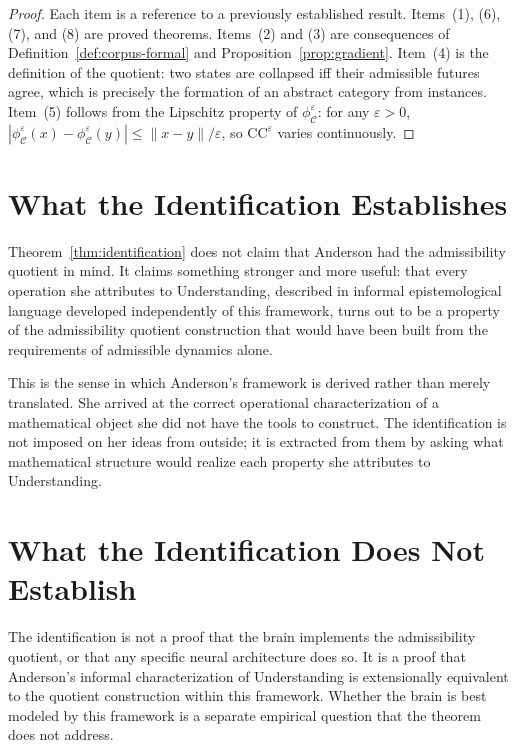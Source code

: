 \documentclass[12pt, a4paper, oneside]{book}
\newcommand{\C}{\mathcal{C}}
\newcommand{\CC}{\mathrm{CC}}
\newcommand{\phiCe}{\phi_{\C}^{\varepsilon}}
\begin{document}
\begin{proof}
Each item is a reference to a previously established result.
Items~(1), (6), (7), and (8) are proved theorems.
Items~(2) and (3) are consequences of Definition~\ref{def:corpus-formal}
and Proposition~\ref{prop:gradient}.
Item~(4) is the definition of the quotient: two states are collapsed iff
their admissible futures agree, which is precisely the formation of an
abstract category from instances.
Item~(5) follows from the Lipschitz property of $\phiCe$: for any
$\varepsilon > 0$, $|\phiCe(x) - \phiCe(y)| \leq \|x - y\| / \varepsilon$,
so $\CC^\varepsilon$ varies continuously.
\end{proof}

\section{What the Identification Establishes}

Theorem~\ref{thm:identification} does not claim that Anderson had the
admissibility quotient in mind. It claims something stronger and more
useful: that every operation she attributes to Understanding, described
in informal epistemological language developed independently of this
framework, turns out to be a property of the admissibility quotient
construction that would have been built from the requirements of
admissible dynamics alone.

This is the sense in which Anderson's framework is derived rather than
merely translated. She arrived at the correct operational characterization
of a mathematical object she did not have the tools to construct. The
identification is not imposed on her ideas from outside; it is
extracted from them by asking what mathematical structure would realize
each property she attributes to Understanding.

\section{What the Identification Does Not Establish}

The identification is not a proof that the brain implements the
admissibility quotient, or that any specific neural architecture does so.
It is a proof that Anderson's informal characterization of Understanding
is extensionally equivalent to the quotient construction within this
framework. Whether the brain is best modeled by this framework is a
separate empirical question that the theorem does not address.
\end{document}
